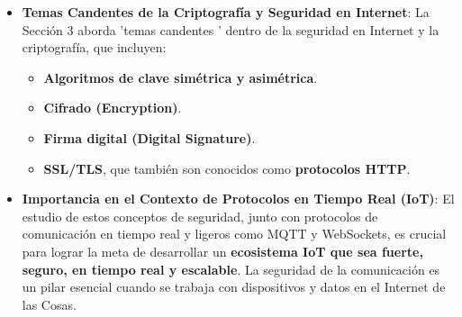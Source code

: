 \documentclass{report}
\begin{document}
\begin{itemize}
    \item \textbf{Temas Candentes de la Criptografía y Seguridad en Internet}: La Sección 3 aborda  'temas candentes ' dentro de la seguridad en Internet 
    y la criptografía, que incluyen:
    \begin{itemize}
        \item \textbf{Algoritmos de clave simétrica y asimétrica}.
        \item \textbf{Cifrado (Encryption)}.
        \item \textbf{Firma digital (Digital Signature)}.
        \item \textbf{SSL/TLS}, que también son conocidos como \textbf{protocolos HTTP}.
    \end{itemize}

    \item \textbf{Importancia en el Contexto de Protocolos en Tiempo Real (IoT)}: El estudio de estos conceptos de seguridad, junto con protocolos de 
    comunicación en tiempo real y ligeros como MQTT y WebSockets, es crucial para lograr la meta de desarrollar un \textbf{ecosistema IoT que sea fuerte, 
    seguro, en tiempo real y escalable}. La seguridad de la comunicación es un pilar esencial cuando se trabaja con dispositivos y datos en el Internet 
    de las Cosas.


\end{itemize}
\end{document}
